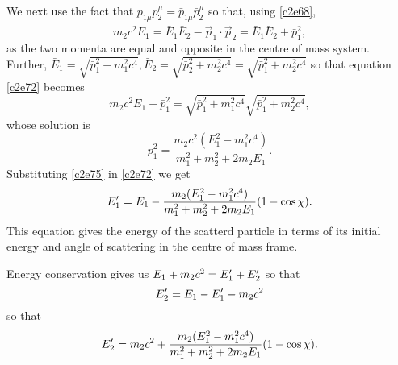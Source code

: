 \begin{enumerate}
We next use the fact that $p_{1\mu}p_2^\mu = \bar{p}_{1\mu}\bar{p}_2^\mu$ so that,
using \eqref{c2e68},
\begin{equation}\label{c2e73}
m_2c^2E_1 = \bar{E}_1\bar{E}_2 - \bar{\vec{p}}_1\cdot\bar{\vec{p}}_2 = 
\bar{E}_1\bar{E}_2 + \bar{p}_1^2,
\end{equation}
as the two momenta are equal and opposite in the centre of mass system. Further, 
$\bar{E}_1 = \sqrt{\bar{p}_1^2 + m_1^2c^4}, \bar{E}_2 = \sqrt{\bar{p}_2^2 + m_2^2c^4}
= \sqrt{\bar{p}_1^2 + m_2^2c^4}$ so that equation \eqref{c2e72} becomes
\begin{equation}\label{c2e74}
m_2c^2E_1 - \bar{p}_1^2 = \sqrt{\bar{p}_1^2 + m_1^2c^4}\sqrt{\bar{p}_1^2 + m_2^2c^4},
\end{equation}
whose solution is
\begin{equation}\label{c2e75}
\bar{p}_1^2 = \frac{m_2c^2(E_1^2 - m_1^2c^4)}{m_1^2 + m_2^2 + 2m_2E_1}.
\end{equation}
Substituting \eqref{c2e75} in \eqref{c2e72} we get
\begin{equation}\label{c2e76}
E_1^\prime = E_1 - \frac{m_2(E_1^2 - m_1^2c^4)}{m_1^2 + m_2^2 + 2m_2E_1}(1 - \cos\chi).
\end{equation}
This equation gives the energy of the scatterd particle in terms of its initial
energy and angle of scattering in the centre of mass frame.

Energy conservation gives us $E_1 + m_2c^2 = E_1^\prime + E_2^\prime$ so that
\[
E_2^\prime = E_1 - E_1^\prime - m_2c^2
\]
so that
\begin{equation}\label{c2e77}
E_2^\prime = m_2c^2 + \frac{m_2(E_1^2 - m_1^2c^4)}{m_1^2 + m_2^2 + 2m_2E_1}(1 - \cos\chi).
\end{equation}
\end{enumerate}